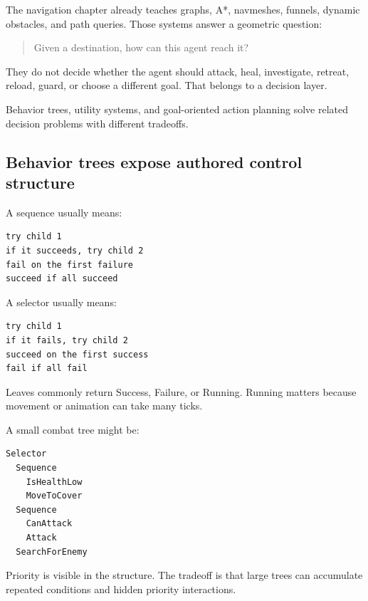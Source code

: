 \hypertarget{06-engine-ii-ch047-navigation-answers-how-to-move-the-decision-layer-answers-what-to-do}{}

The navigation chapter already teaches graphs, A*, navmeshes, funnels, dynamic obstacles, and path queries. Those systems answer a geometric question:

\begin{quote}
Given a destination, how can this agent reach it?
\end{quote}

They do not decide whether the agent should attack, heal, investigate, retreat, reload, guard, or choose a different goal. That belongs to a decision layer.

Behavior trees, utility systems, and goal-oriented action planning solve related decision problems with different tradeoffs.

\subsection{Behavior trees expose authored control structure}\label{06-engine-ii-ch047-behavior-trees-expose-authored-control-structure}

\hypertarget{06-engine-ii-ch047-behavior-trees-expose-authored-control-structure}{}

A sequence usually means:

\begin{verbatim}
try child 1
if it succeeds, try child 2
fail on the first failure
succeed if all succeed
\end{verbatim}

A selector usually means:

\begin{verbatim}
try child 1
if it fails, try child 2
succeed on the first success
fail if all fail
\end{verbatim}

Leaves commonly return Success, Failure, or Running. Running matters because movement or animation can take many ticks.

A small combat tree might be:

\begin{verbatim}
Selector
  Sequence
    IsHealthLow
    MoveToCover
  Sequence
    CanAttack
    Attack
  SearchForEnemy
\end{verbatim}

Priority is visible in the structure. The tradeoff is that large trees can accumulate repeated conditions and hidden priority interactions.

